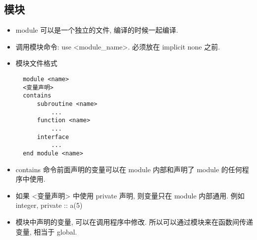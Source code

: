 \subsection{模块}

\begin{itemize}
\item module 可以是一个独立的文件, 编译的时候一起编译.
\item 调用模块命令:  use <module_name>.  必须放在 implicit none 之前.
\item 模块文件格式
\begin{lstlisting}
  module <name>
  <变量声明>
  contains
      subroutine <name>
          ...
      function <name>
          ...
      interface
          ...
  end module <name>
\end{lstlisting}
\item contains 命令前面声明的变量可以在 module 内部和声明了 module 的任何程序中使用.
\item 如果 <变量声明> 中使用 private 声明, 则变量只在 module 内部通用. 例如
   integer, private :: a(5)
\item 模块中声明的变量, 可以在调用程序中修改. 所以可以通过模块来在函数间传递变量, 相当于 global.
\end{itemize}
